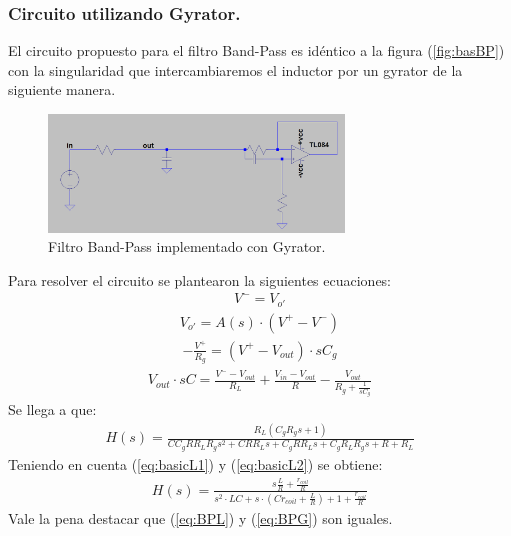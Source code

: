 \documentclass[a4paper]{article}
\begin{document}
\subsubsection{Circuito utilizando Gyrator.}
El circuito propuesto para el filtro Band-Pass es idéntico a la figura (\ref{fig:basBP}) con la singularidad que intercambiaremos el inductor por un gyrator de la siguiente manera.
\begin{figure}[H]	
	\centering
	\includegraphics[width=0.7\textwidth]{ImagenesEj2/gyrBP.PNG}
	\caption{Filtro Band-Pass implementado con Gyrator.}
	\label{fig:gyrBP}
\end{figure}
Para resolver el circuito se plantearon la siguientes ecuaciones:
\begin{align}V^- = V_{o'}\end{align}
\begin{align}V_{o'} = A(s)\cdot (V^+-V^-)\end{align}
\begin{align} -\frac{V^+}{R_g}=(V^+-V_{out})\cdot sC_g \end{align}
\begin{align}  V_{out}\cdot sC= \frac{V^--V_{out}}{R_L}+\frac{V_{in}-V_{out}}{R}-\frac{V_{out}}{R_g+\frac{1}{sC_g}}\end{align}
Se llega a que:
\begin{align}H(s)=\frac{R_{L} \left(C_{g} R_{g} s + 1\right)}{C C_{g} R R_{L} R_{g} s^{2} + C R R_{L} s + C_{g} R R_{L} s + C_{g} R_{L} R_{g} s + R + R_{L}}
\end{align}
Teniendo en cuenta (\ref{eq:basicL1}) y (\ref{eq:basicL2}) se obtiene:
\begin{align}H(s)=\frac{s\frac{L}{R}+\frac{r_{coil}}{R}}{s^2\cdot LC +s \cdot (Cr_{coil}+\frac{L}{R})+1+\frac{r_{coil}}{R}}
\label{eq:BPG}
\end{align}
Vale la pena destacar que (\ref{eq:BPL}) y (\ref{eq:BPG}) son iguales.
\end{document}
